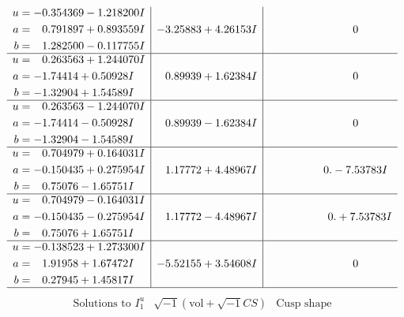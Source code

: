 \documentclass[1p]{elsarticle_modified}
\theoremstyle{definition}
\newcommand{\I}{\sqrt{-1}}
\begin{document}
$$\begin{array}{c|c|c}
\begin{aligned}
u &= -0.354369 - 1.218200 I \\
a &= \phantom{-}0.791897 + 0.893559 I \\
b &= \phantom{-}1.282500 - 0.117755 I\end{aligned}
 & -3.25883 + 4.26153 I & \phantom{-0.000000 } 0 \\ \hline\begin{aligned}
u &= \phantom{-}0.263563 + 1.244070 I \\
a &= -1.74414 + 0.50928 I \\
b &= -1.32904 + 1.54589 I\end{aligned}
 & \phantom{-}0.89939 + 1.62384 I & \phantom{-0.000000 } 0 \\ \hline\begin{aligned}
u &= \phantom{-}0.263563 - 1.244070 I \\
a &= -1.74414 - 0.50928 I \\
b &= -1.32904 - 1.54589 I\end{aligned}
 & \phantom{-}0.89939 - 1.62384 I & \phantom{-0.000000 } 0 \\ \hline\begin{aligned}
u &= \phantom{-}0.704979 + 0.164031 I \\
a &= -0.150435 + 0.275954 I \\
b &= \phantom{-}0.75076 - 1.65751 I\end{aligned}
 & \phantom{-}1.17772 + 4.48967 I & \phantom{-0.000000 } 0. - 7.53783 I \\ \hline\begin{aligned}
u &= \phantom{-}0.704979 - 0.164031 I \\
a &= -0.150435 - 0.275954 I \\
b &= \phantom{-}0.75076 + 1.65751 I\end{aligned}
 & \phantom{-}1.17772 - 4.48967 I & \phantom{-0.000000 -}0. + 7.53783 I \\ \hline\begin{aligned}
u &= -0.138523 + 1.273300 I \\
a &= \phantom{-}1.91958 + 1.67472 I \\
b &= \phantom{-}0.27945 + 1.45817 I\end{aligned}
 & -5.52155 + 3.54608 I & \phantom{-0.000000 } 0\\
 \hline 
 \end{array}$$\newpage$$\begin{array}{c|c|c}  
\text{Solutions to }I^u_{1}& \I (\text{vol} + \sqrt{-1}CS) & \text{Cusp shape}\\

\end{array}$$
\end{document}
